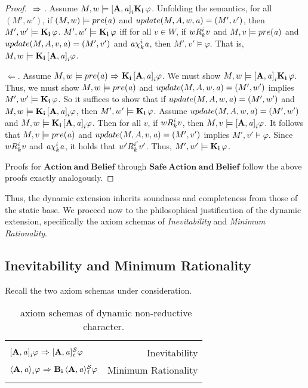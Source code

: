 \begin{proof}
${\ \Rightarrow \ }$. Assume $M,w \models \mathbf{[A,\mathit{a}]}_i\mathbf{K}_{\mathbf{i}}\,\varphi$. Unfolding the semantics, for all $(M',w')$, if $(M,w)\models pre(\mathit{a})$ and $update(M,A,w,\mathit{a})=(M',v')$, then $M',w'\models\mathbf{K}_{\mathbf{i}}\,\varphi$. $M',w'\models \mathbf{K}_{\mathbf{i}}\,\varphi$ iff for all $v\in W$, if $wR_{k}^iv$ and $M,v\models pre(\mathit{a})$ and $update(M,A,v,\mathit{a})=(M',v')$ and  $\mathit{a}\chi_{k}^i\mathit{a}$, then $M',v'\models\varphi$. That is, $M,w\models \mathbf{K}_{\mathbf{i}}\,\mathbf{[A,\mathit{a}]}_i\varphi$. 

$\Leftarrow$. Assume $M,w \models pre(\mathit{a}) {\ \Rightarrow \ } \mathbf{K}_{\mathbf{i}}\,\mathbf{[A,\mathit{a}]}_i\varphi$. We must show $M,w \models \mathbf{[A,\mathit{a}]}_i\mathbf{K}_{\mathbf{i}}\,\varphi$. Thus, we must show $M,w \models pre(\mathit{a})$ and $update(M,A,w,\mathit{a})=(M',w')$ implies $M',w' \models \mathbf{K}_{\mathbf{i}}\,\varphi$. So it suffices to show that if $update(M,A,w,\mathit{a})=(M',w')$ and $M,w\models \mathbf{K}_{\mathbf{i}}\,\mathbf{[A,\mathit{a}]}_i\varphi$, then $M',w'\models \mathbf{K}_{\mathbf{i}}\,\varphi$. Assume $update(M,A,w,\mathit{a})=(M',w')$ and $M,w\models\mathbf{K}_{\mathbf{i}}\,\mathbf{[A,\mathit{a}]}_i\varphi$. Then for all $v$, if $wR_{k}^iv$, then $M,v\models\mathbf{[A,\mathit{a}]}_i\varphi$. It follows that $M,v\models pre(\mathit{a})$ and $update(M,A,v,\mathit{a})=(M',v')$ implies $M',v'\models\varphi$. Since $wR_{k}^iv$ and $\mathit{a}\chi_{k}^i\mathit{a}$, it holds that $w'R_{k}^{i'}v'$. Thus, $M',w'\models\mathbf{K}_{\mathbf{i}}\,\varphi$.

Proofs for $\mathbf{Action\ and\ Belief}$ through $\mathbf{Safe\ Action\ and\ Belief}$ follow the above proofs exactly analogously.

\end{proof}

Thus, the dynamic extension inherits soundness and completeness from those of the static base. We proceed now to the philosophical justification of the dynamic extension, specifically the axiom schemas of \emph{Inevitability} and \emph{Minimum Rationality}.

\subsection{Inevitability and Minimum Rationality}\label{sec:dyn_ext}

Recall the two axiom schemas under consideration.
\begin{table}[H]
	\begin{center}
		\begin{tabular}{| l r |}
			\hline 
&\\
$\mathbf{[A,\mathit{a}]}_i\varphi {\ \Rightarrow \ } \mathbf{[A,\mathit{a}]_{\mathit{i}}^\mathcal{S}}\varphi$ & Inevitability\\
$\mathbf{\langle A,\mathit{a}\rangle}_i\varphi {\ \Rightarrow \ } \mathbf{B}_{\mathbf{i}}\,\mathbf{\langle A,\mathit{a}\rangle_{\mathit{i}}^\mathcal{S}}\varphi$ & Minimum Rationality\\ & \\
\hline
\end{tabular}
\caption{\DASL\ axiom schemas of dynamic non-reductive character.}
\end{center}
\end{table}

